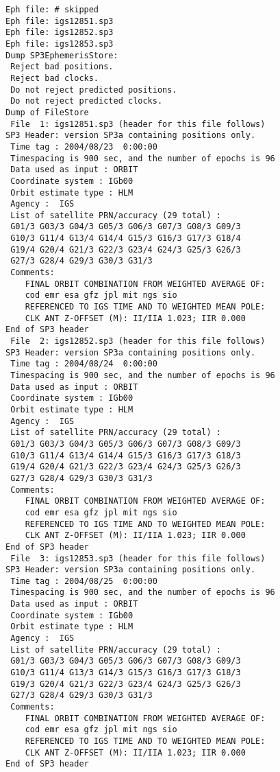 \begin{verbatim}
Eph file: # skipped
Eph file: igs12851.sp3
Eph file: igs12852.sp3
Eph file: igs12853.sp3
Dump SP3EphemerisStore:
 Reject bad positions.
 Reject bad clocks.
 Do not reject predicted positions.
 Do not reject predicted clocks.
Dump of FileStore
 File  1: igs12851.sp3 (header for this file follows)
SP3 Header: version SP3a containing positions only.
 Time tag : 2004/08/23  0:00:00
 Timespacing is 900 sec, and the number of epochs is 96
 Data used as input : ORBIT
 Coordinate system : IGb00
 Orbit estimate type : HLM
 Agency :  IGS
 List of satellite PRN/accuracy (29 total) :
 G01/3 G03/3 G04/3 G05/3 G06/3 G07/3 G08/3 G09/3
 G10/3 G11/4 G13/4 G14/4 G15/3 G16/3 G17/3 G18/4
 G19/4 G20/4 G21/3 G22/3 G23/4 G24/3 G25/3 G26/3
 G27/3 G28/4 G29/3 G30/3 G31/3
 Comments:
    FINAL ORBIT COMBINATION FROM WEIGHTED AVERAGE OF:        
    cod emr esa gfz jpl mit ngs sio                          
    REFERENCED TO IGS TIME AND TO WEIGHTED MEAN POLE:        
    CLK ANT Z-OFFSET (M): II/IIA 1.023; IIR 0.000            
End of SP3 header
 File  2: igs12852.sp3 (header for this file follows)
SP3 Header: version SP3a containing positions only.
 Time tag : 2004/08/24  0:00:00
 Timespacing is 900 sec, and the number of epochs is 96
 Data used as input : ORBIT
 Coordinate system : IGb00
 Orbit estimate type : HLM
 Agency :  IGS
 List of satellite PRN/accuracy (29 total) :
 G01/3 G03/3 G04/3 G05/3 G06/3 G07/3 G08/3 G09/3
 G10/3 G11/4 G13/4 G14/4 G15/3 G16/3 G17/3 G18/3
 G19/4 G20/4 G21/3 G22/3 G23/4 G24/3 G25/3 G26/3
 G27/3 G28/4 G29/3 G30/3 G31/3
 Comments:
    FINAL ORBIT COMBINATION FROM WEIGHTED AVERAGE OF:        
    cod emr esa gfz jpl mit ngs sio                          
    REFERENCED TO IGS TIME AND TO WEIGHTED MEAN POLE:        
    CLK ANT Z-OFFSET (M): II/IIA 1.023; IIR 0.000            
End of SP3 header
 File  3: igs12853.sp3 (header for this file follows)
SP3 Header: version SP3a containing positions only.
 Time tag : 2004/08/25  0:00:00
 Timespacing is 900 sec, and the number of epochs is 96
 Data used as input : ORBIT
 Coordinate system : IGb00
 Orbit estimate type : HLM
 Agency :  IGS
 List of satellite PRN/accuracy (29 total) :
 G01/3 G03/3 G04/3 G05/3 G06/3 G07/3 G08/3 G09/3
 G10/3 G11/4 G13/3 G14/3 G15/3 G16/3 G17/3 G18/3
 G19/3 G20/4 G21/3 G22/3 G23/4 G24/3 G25/3 G26/3
 G27/3 G28/4 G29/3 G30/3 G31/3
 Comments:
    FINAL ORBIT COMBINATION FROM WEIGHTED AVERAGE OF:        
    cod emr esa gfz jpl mit ngs sio                          
    REFERENCED TO IGS TIME AND TO WEIGHTED MEAN POLE:        
    CLK ANT Z-OFFSET (M): II/IIA 1.023; IIR 0.000            
End of SP3 header

\end{verbatim}
